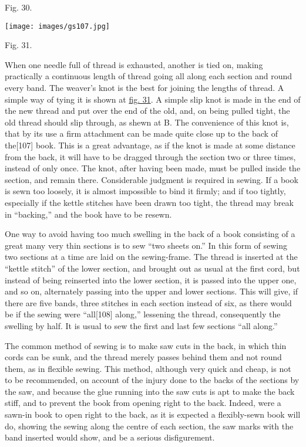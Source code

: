 \documentclass[
]{article}
\begin{document}
Fig. 30.

\protect\hypertarget{Fig_31}{}{}
\texttt{[image: images/gs107.jpg]}

Fig. 31.

When one needle full of thread is exhausted, another is tied on, making
practically a continuous length of thread going all along each section
and round every band. The weaver's knot is the best for joining the
lengths of thread. A simple way of tying it is shown at
\protect\hyperlink{Fig_31}{fig. 31}. A simple slip knot is made in the
end of the new thread and put over the end of the old, and, on being
pulled tight, the old thread should slip through, as shewn at B. The
convenience of this knot is, that by its use a firm attachment can be
made quite close up to the back of
the{\protect\hypertarget{Page_107}{}{{[}107{]}}} book. This is a great
advantage, as if the knot is made at some distance from the back, it
will have to be dragged through the section two or three times, instead
of only once. The knot, after having been made, must be pulled inside
the section, and remain there. Considerable judgment is required in
sewing. If a book is sewn too loosely, it is almost impossible to bind
it firmly; and if too tightly, especially if the kettle stitches have
been drawn too tight, the thread may break in ``backing,'' and the book
have to be resewn.

One way to avoid having too much swelling in the back of a book
consisting of a great many very thin sections is to sew ``two sheets
on.'' In this form of sewing two sections at a time are laid on the
sewing-frame. The thread is inserted at the ``kettle stitch'' of the
lower section, and brought out as usual at the first cord, but instead
of being reinserted into the lower section, it is passed into the upper
one, and so on, alternately passing into the upper and lower sections.
This will give, if there are five bands, three stitches in each section
instead of six, as there would be if the sewing were
``all{\protect\hypertarget{Page_108}{}{{[}108{]}}} along,'' lessening
the thread, consequently the swelling by half. It is usual to sew the
first and last few sections ``all along.''

The common method of sewing is to make saw cuts in the back, in which
thin cords can be sunk, and the thread merely passes behind them and not
round them, as in flexible sewing. This method, although very quick and
cheap, is not to be recommended, on account of the injury done to the
backs of the sections by the saw, and because the glue running into the
saw cuts is apt to make the back stiff, and to prevent the book from
opening right to the back. Indeed, were a sawn-in book to open right to
the back, as it is expected a flexibly-sewn book will do, showing the
sewing along the centre of each section, the saw marks with the band
inserted would show, and be a serious disfigurement.
\end{document}
